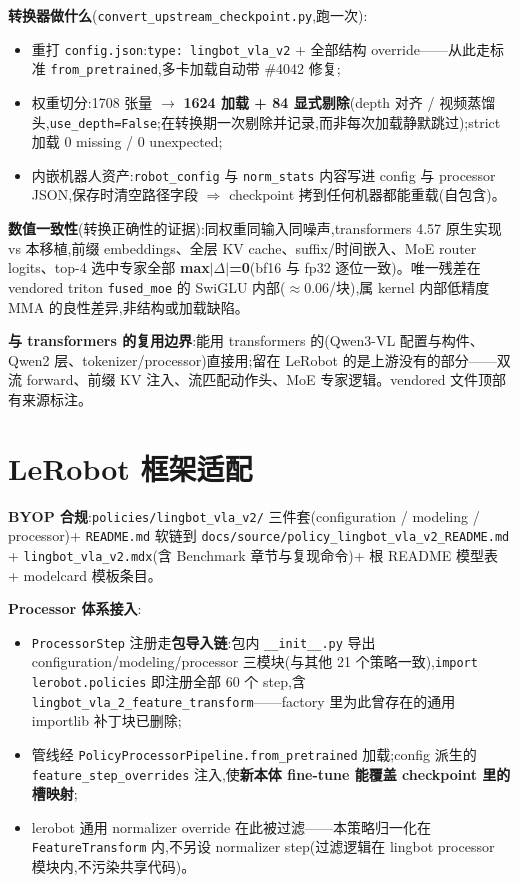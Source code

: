 \documentclass[11pt]{ctexart}
\begin{document}
\textbf{转换器做什么}(\texttt{convert\_upstream\_checkpoint.py},跑一次):
\begin{itemize}[nosep,leftmargin=1.4em]
  \item 重打 \texttt{config.json}:\texttt{type: lingbot\_vla\_v2} + 全部结构 override——从此走标准 \texttt{from\_pretrained},多卡加载自动带 \#4042 修复;
  \item 权重切分:1708 张量 $\to$ \textbf{1624 加载 + 84 显式剔除}(depth 对齐 / 视频蒸馏头,\texttt{use\_depth=False};在转换期一次剔除并记录,而非每次加载静默跳过);strict 加载 0 missing / 0 unexpected;
  \item 内嵌机器人资产:\texttt{robot\_config} 与 \texttt{norm\_stats} 内容写进 config 与 processor JSON,保存时清空路径字段 $\Rightarrow$ checkpoint 拷到任何机器都能重载(自包含)。
\end{itemize}

\textbf{数值一致性}(转换正确性的证据):同权重同输入同噪声,transformers 4.57 原生实现 vs 本移植,前缀 embeddings、全层 KV cache、suffix/时间嵌入、MoE router logits、top-4 选中专家全部 \textbf{max$|\Delta|$=0}(bf16 与 fp32 逐位一致)。唯一残差在 vendored triton \texttt{fused\_moe} 的 SwiGLU 内部($\approx$0.06/块),属 kernel 内部低精度 MMA 的良性差异,非结构或加载缺陷。

\textbf{与 transformers 的复用边界}:能用 transformers 的(Qwen3-VL 配置与构件、Qwen2 层、tokenizer/processor)直接用;留在 LeRobot 的是上游没有的部分——双流 forward、前缀 KV 注入、流匹配动作头、MoE 专家逻辑。vendored 文件顶部有来源标注。

\section{LeRobot 框架适配}

\textbf{BYOP 合规}:\texttt{policies/lingbot\_vla\_v2/} 三件套(configuration / modeling / processor)+ \texttt{README.md} 软链到 \texttt{docs/source/policy\_lingbot\_vla\_v2\_README.md} + \texttt{lingbot\_vla\_v2.mdx}(含 Benchmark 章节与复现命令)+ 根 README 模型表 + modelcard 模板条目。

\textbf{Processor 体系接入}:
\begin{itemize}[nosep,leftmargin=1.4em]
  \item \texttt{ProcessorStep} 注册走\textbf{包导入链}:包内 \texttt{\_\_init\_\_.py} 导出 configuration/modeling/processor 三模块(与其他 21 个策略一致),\texttt{import lerobot.policies} 即注册全部 60 个 step,含 \texttt{lingbot\_vla\_2\_feature\_transform}——factory 里为此曾存在的通用 importlib 补丁块已删除;
  \item 管线经 \texttt{PolicyProcessorPipeline.from\_pretrained} 加载;config 派生的 \texttt{feature\_step\_overrides} 注入,使\textbf{新本体 fine-tune 能覆盖 checkpoint 里的槽映射};
  \item lerobot 通用 normalizer override 在此被过滤——本策略归一化在 \texttt{FeatureTransform} 内,不另设 normalizer step(过滤逻辑在 lingbot processor 模块内,不污染共享代码)。
\end{itemize}
\end{document}
